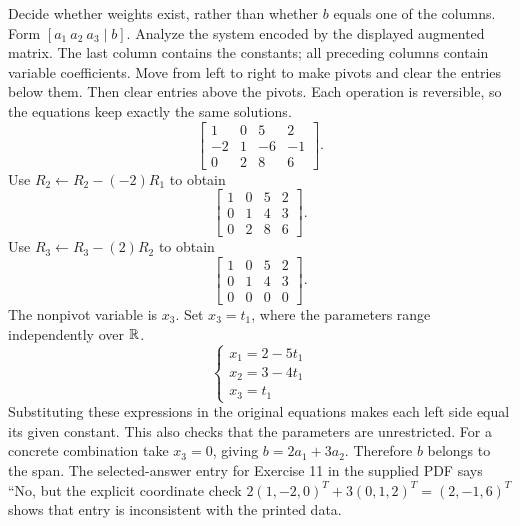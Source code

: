 \goal Decide whether weights exist, rather than whether $b$ equals one of the columns. Form $[a_1\ a_2\ a_3\mid b]$.
\goal Analyze the system encoded by the displayed augmented matrix. The last column contains the constants; all preceding columns contain variable coefficients.
\idea Move from left to right to make pivots and clear the entries below them. Then clear entries above the pivots. Each operation is reversible, so the equations keep exactly the same solutions.
\[ \left[\begin{array}{rrr|r}1&0&5&2\\-2&1&-6&-1\\0&2&8&6\end{array}\right].\]
Use $R_{2}\leftarrow R_{2}-(-2)R_{1}$ to obtain
\[ \left[\begin{array}{rrr|r}1&0&5&2\\0&1&4&3\\0&2&8&6\end{array}\right].\]
Use $R_{3}\leftarrow R_{3}-(2)R_{2}$ to obtain
\[ \left[\begin{array}{rrr|r}1&0&5&2\\0&1&4&3\\0&0&0&0\end{array}\right].\]
The nonpivot variable is $x_{3}$. Set $x_{3}=t_{1}$, where the parameters range independently over $\mathbb{R}$.
\[ \begin{cases}x_{1}=2 - 5 t_{1}\\x_{2}=3 - 4 t_{1}\\x_{3}=t_{1}\end{cases}\]
Substituting these expressions in the original equations makes each left side equal its given constant. This also checks that the parameters are unrestricted.
For a concrete combination take $x_3=0$, giving $b=2a_1+3a_2$. Therefore $b$ belongs to the span. The selected-answer entry for Exercise 11 in the supplied PDF says ``No, but the explicit coordinate check $2(1,-2,0)^T+3(0,1,2)^T=(2,-1,6)^T$ shows that entry is inconsistent with the printed data.

